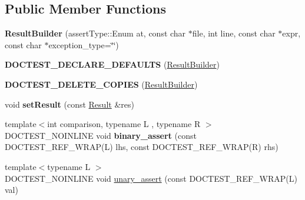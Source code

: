 \subsection*{Public Member Functions}
\begin{DoxyCompactItemize}
\item 
\mbox{\label{structdoctest_1_1detail_1_1_result_builder_aff70d88209d48696fa10e9caa10cdd4c}} 
{\bfseries Result\+Builder} (assert\+Type\+::\+Enum at, const char $\ast$file, int line, const char $\ast$expr, const char $\ast$exception\+\_\+type=\char`\"{}\char`\"{})
\item 
\mbox{\label{structdoctest_1_1detail_1_1_result_builder_ad639efd1deb8baced5fb162602a63a20}} 
{\bfseries D\+O\+C\+T\+E\+S\+T\+\_\+\+D\+E\+C\+L\+A\+R\+E\+\_\+\+D\+E\+F\+A\+U\+L\+TS} (\mbox{\hyperlink{structdoctest_1_1detail_1_1_result_builder}{Result\+Builder}})
\item 
\mbox{\label{structdoctest_1_1detail_1_1_result_builder_aac08f8617548de380d708203559f86fe}} 
{\bfseries D\+O\+C\+T\+E\+S\+T\+\_\+\+D\+E\+L\+E\+T\+E\+\_\+\+C\+O\+P\+I\+ES} (\mbox{\hyperlink{structdoctest_1_1detail_1_1_result_builder}{Result\+Builder}})
\item 
\mbox{\label{structdoctest_1_1detail_1_1_result_builder_a86c0ca727fead43263de4a7e9a59ad23}} 
void {\bfseries set\+Result} (const \mbox{\hyperlink{structdoctest_1_1detail_1_1_result}{Result}} \&res)
\item 
\mbox{\label{structdoctest_1_1detail_1_1_result_builder_ab3d55b158b3ae687f80bca94db6bb701}} 
{\footnotesize template$<$int comparison, typename L , typename R $>$ }\\D\+O\+C\+T\+E\+S\+T\+\_\+\+N\+O\+I\+N\+L\+I\+NE void {\bfseries binary\+\_\+assert} (const D\+O\+C\+T\+E\+S\+T\+\_\+\+R\+E\+F\+\_\+\+W\+R\+AP(L) lhs, const D\+O\+C\+T\+E\+S\+T\+\_\+\+R\+E\+F\+\_\+\+W\+R\+AP(R) rhs)
\item 
{\footnotesize template$<$typename L $>$ }\\D\+O\+C\+T\+E\+S\+T\+\_\+\+N\+O\+I\+N\+L\+I\+NE void \mbox{\hyperlink{structdoctest_1_1detail_1_1_result_builder_a98c33e90242e2859255a79cb38489f3b}{unary\+\_\+assert}} (const D\+O\+C\+T\+E\+S\+T\+\_\+\+R\+E\+F\+\_\+\+W\+R\+AP(L) val)

\end{DoxyCompactItemize}
